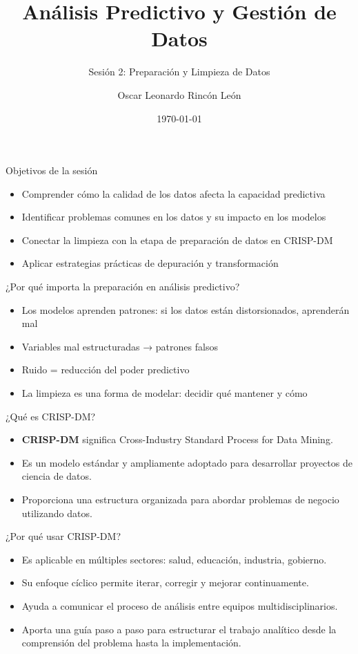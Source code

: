 \documentclass{beamer}
\title{Análisis Predictivo y Gestión de Datos}
\subtitle{Sesión 2: Preparación y Limpieza de Datos}
\author{Oscar Leonardo Rincón León}
\date{\today}
\begin{document}
\frame{\titlepage}

\begin{frame}{Objetivos de la sesión}
\begin{itemize}
    \item Comprender cómo la calidad de los datos afecta la capacidad predictiva
    \item Identificar problemas comunes en los datos y su impacto en los modelos
    \item Conectar la limpieza con la etapa de preparación de datos en CRISP-DM
    \item Aplicar estrategias prácticas de depuración y transformación
\end{itemize}
\end{frame}

\begin{frame}{¿Por qué importa la preparación en análisis predictivo?}
\begin{itemize}
    \item Los modelos aprenden patrones: si los datos están distorsionados, aprenderán mal
    \item Variables mal estructuradas → patrones falsos
    \item Ruido = reducción del poder predictivo
    \item La limpieza es una forma de modelar: decidir qué mantener y cómo
\end{itemize}
\end{frame}


\begin{frame}{¿Qué es CRISP-DM?}
\begin{itemize}
    \item \textbf{CRISP-DM} significa Cross-Industry Standard Process for Data Mining.
    \item Es un modelo estándar y ampliamente adoptado para desarrollar proyectos de ciencia de datos.
    \item Proporciona una estructura organizada para abordar problemas de negocio utilizando datos.
\end{itemize}
\end{frame}

\begin{frame}{¿Por qué usar CRISP-DM?}
\begin{itemize}
    \item Es aplicable en múltiples sectores: salud, educación, industria, gobierno.
    \item Su enfoque cíclico permite iterar, corregir y mejorar continuamente.
    \item Ayuda a comunicar el proceso de análisis entre equipos multidisciplinarios.
    \item Aporta una guía paso a paso para estructurar el trabajo analítico desde la comprensión del problema hasta la implementación.
\end{itemize}
\end{frame}
\end{document}
